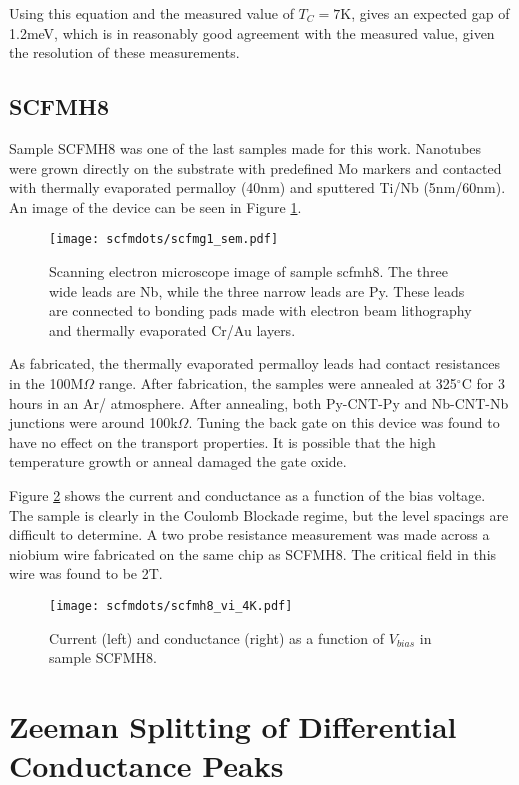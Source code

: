 Using this equation and the measured value of $T_C = 7$K, gives an expected gap of 1.2meV, which is in reasonably good agreement with the measured value, given the resolution of these measurements.

\subsection*{SCFMH8}

Sample SCFMH8 was one of the last samples made for this work. Nanotubes were grown directly on the substrate with predefined Mo markers and contacted with thermally evaporated permalloy (40nm) and sputtered Ti/Nb (5nm/60nm). An image of the device can be seen in Figure \ref{fig:scfmh8}.

\begin{figure}
    \centering
    \texttt{[image: scfmdots/scfmg1\_sem.pdf]}
    \caption{Scanning electron microscope image of sample scfmh8. The three wide leads are Nb, while the three narrow leads are Py. These leads are connected to bonding pads made with electron beam lithography and thermally evaporated Cr/Au layers.}
    \label{fig:scfmh8}
\end{figure}

As fabricated, the thermally evaporated permalloy leads had contact resistances in the 100M$\Omega$ range. After fabrication, the samples were annealed at 325$^\circ$C for 3 hours in an Ar/ atmosphere. After annealing, both Py-CNT-Py and Nb-CNT-Nb junctions were around 100k$\Omega$. Tuning the back gate on this device was found to have no effect on the transport properties. It is possible that the high temperature growth or anneal damaged the gate oxide.

Figure \ref{fig:scfmh8_vi} shows the current and conductance as a function of the bias voltage. The sample is clearly in the Coulomb Blockade regime, but the level spacings are difficult to determine. A two probe resistance measurement was made across a niobium wire fabricated on the same chip as SCFMH8. The critical field in this wire was found to be 2T.

\begin{figure}
    \centering
    \texttt{[image: scfmdots/scfmh8\_vi\_4K.pdf]}
    \caption{Current (left) and conductance (right) as a function of $V_{bias}$ in sample SCFMH8.}
    \label{fig:scfmh8_vi}
\end{figure}

\section{Zeeman Splitting of Differential Conductance Peaks}

